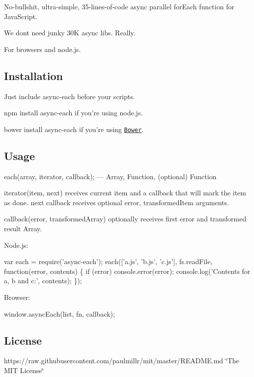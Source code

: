 No-\/bullshit, ultra-\/simple, 35-\/lines-\/of-\/code async parallel for\+Each function for Java\+Script.

We don\textquotesingle{}t need junky 30K async libs. Really.

For browsers and node.\+js.

\subsection*{Installation}


\begin{DoxyItemize}
\item Just include async-\/each before your scripts.
\item {\ttfamily npm install async-\/each} if you’re using node.\+js.
\item {\ttfamily bower install async-\/each} if you’re using \href{http://bower.io}{\tt Bower}.
\end{DoxyItemize}

\subsection*{Usage}


\begin{DoxyItemize}
\item {\ttfamily each(array, iterator, callback);} — {\ttfamily Array}, {\ttfamily Function}, {\ttfamily (optional) Function}
\item {\ttfamily iterator(item, next)} receives current item and a callback that will mark the item as done. {\ttfamily next} callback receives optional {\ttfamily error, transformed\+Item} arguments.
\item {\ttfamily callback(error, transformed\+Array)} optionally receives first error and transformed result {\ttfamily Array}.
\end{DoxyItemize}

Node.\+js\+:


\begin{DoxyCode}
var each = require('async-each');
each(['a.js', 'b.js', 'c.js'], fs.readFile, function(error, contents) \{
  if (error) console.error(error);
  console.log('Contents for a, b and c:', contents);
\});
\end{DoxyCode}


Browser\+:


\begin{DoxyCode}
window.asyncEach(list, fn, callback);
\end{DoxyCode}


\subsection*{License}

https\+://raw.githubusercontent.\+com/paulmillr/mit/master/\+R\+E\+A\+D\+ME.md \char`\"{}\+The M\+I\+T License\char`\"{} 